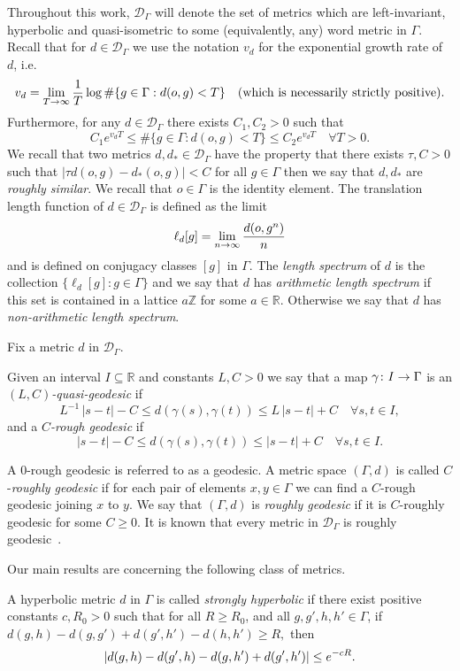 \documentclass[AHL,Unicode,longabstracts,published]{cedram}
\newcommand{\g}{\gamma}
\newcommand{\G}{\Gamma}
\newcommand{\Dc}{\mathcal{D}}
\newcommand{\R}{\mathbb{R}}
\newcommand{\Z}{\mathbb{Z}}
\let\originalleft\left
\let\originalright\right
\renewcommand{\left}{\mathopen{}\mathclose\bgroup\originalleft}
\renewcommand{\right}{\aftergroup\egroup\originalright}
\renewcommand*{\to}{\mathchoice{\longrightarrow}{\rightarrow}{\rightarrow}{\rightarrow}}
\theoremstyle{plain}
\let\oldforall\forall
\renewcommand*{\forall}{\mathrel{\oldforall}}
\newcommand{\G}{\Gamma}
\begin{document}
Throughout this work, $\Dc_\G$ will denote the set of metrics which are left-invariant, hyperbolic and quasi-isometric to some (equivalently, any) word metric in $\G$. Recall that for $d\in \Dc_\G$ we use the notation $v_d$ for the exponential growth rate of $d$, i.e.
\[
v_d = \lim_{T\to\infty} \frac{1}{T} \log \#\{ g\in\G: d(o,g) < T\} \quad \text{(which is necessarily strictly positive)}.
\]
Furthermore, for any $d \in \Dc_\G$ there exists $C_1, C_2 > 0$ such that
\[
C_1 e^{v_d T} \le \#\{g \in \G: d(o,g) < T\} \le C_2 e^{v_d T} \quad \forall T > 0.
\]
We recall that two metrics $d,d_\ast \in \Dc_\G$ have the property that there exists $\tau, C >0$ such that $|\tau d(o,g) - d_\ast(o,g)| < C$ for all $g\in\G$ then we say that $d,d_\ast$ are \emph{roughly similar}. We recall that $o\in\G$ is the identity element. The translation length function of $d \in \Dc_\G$ is defined as the limit
\[
\ell_d[g] = \lim_{n\to\infty} \frac{d(o,g^n)}{n}
\]
and is defined on conjugacy classes $[g]$ in $\G$. The \emph{length spectrum} of $d$ is the collection $\{ \ell_d[g] : g \in \G\}$ and we say that $d$ has \emph{arithmetic length spectrum} if this set is contained in a lattice $a \Z$ for some $a \in \R$. Otherwise we say that $d$ has \emph{non-arithmetic length spectrum}.

Fix a metric $d$ in $\Dc_\G$.

\begin{defi}\label{def.geo}
Given an interval $I \subseteq \R$ and constants $L, C >0$ we say that a map $\g\colon I \to \G$ is an \emph{$(L, C)$-quasi-geodesic} if
\[
L^{-1} \, |s-t|-C \le d(\g(s), \g(t)) \le L\, |s-t|+C \quad \forall s, t \in I,
\]
and a \emph{$C$-rough geodesic} if
\[
|s-t|-C \le d(\gamma(s), \gamma(t))\le |s-t|+C \quad \forall s, t \in I.
\]
\end{defi}

A $0$-rough geodesic is referred to as a geodesic. A metric space $(\G, d)$ is called $C$-\emph{roughly geodesic} if for each pair of elements $x, y \in \G$ we can find a $C$-rough geodesic joining $x$ to $y$. We say that $(\G,d)$ is \emph{roughly geodesic} if it is $C$-roughly geodesic for some $C \ge 0$. It is known that every metric in $\Dc_\G$ is roughly geodesic~\cite{BonkSchramm}.


Our main results are concerning the following class of metrics.

\begin{defi}
A hyperbolic metric $d$ in $\G$ is called \emph{strongly hyperbolic} if there exist positive constants $c, R_0 > 0$ such that for all $R \ge R_0$, and all $g, g', h, h' \in \G$, if $ d(g, h)-d(g, g')+d(g', h')-d(h, h') \ge R,$ then
\[
\left|d(g, h)-d(g', h)-d(g, h')+d(g', h')\right| \le e^{-c R}.
\]
\end{defi}
\end{document}
